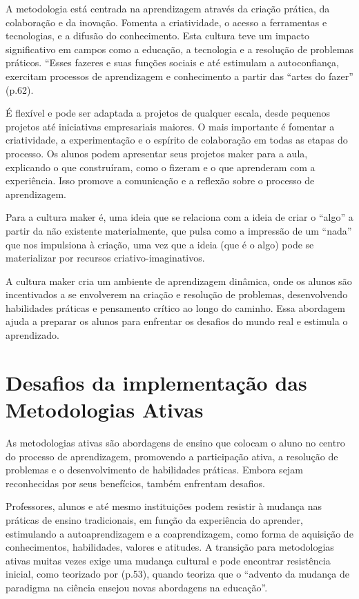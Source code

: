 A metodologia está centrada na aprendizagem através da criação prática, da colaboração e da inovação. Fomenta a criatividade, o acesso a ferramentas e tecnologias, e a difusão do conhecimento. Esta cultura teve um impacto significativo em campos como a educação, a tecnologia e a resolução de problemas práticos. ``Esses fazeres e suas funções sociais e até estimulam a autoconfiança, exercitam processos de aprendizagem e conhecimento a partir das ``artes do fazer'' \cite{CABRAL2021} (p.62).

É flexível e pode ser adaptada a projetos de qualquer escala, desde pequenos projetos até iniciativas empresariais maiores. O mais importante é fomentar a criatividade, a experimentação e o espírito de colaboração em todas as etapas do processo. Os alunos podem apresentar seus projetos maker para a aula, explicando o que construíram, como o fizeram e o que aprenderam com a experiência. Isso promove a comunicação e a reflexão sobre o processo de aprendizagem.

Para  a cultura maker é, uma ideia que se relaciona com a ideia de criar o ``algo'' a partir da não existente materialmente, que pulsa como a impressão de um ``nada'' que nos impulsiona à criação, uma vez que a ideia (que é o algo) pode se materializar por recursos criativo-imaginativos.

A cultura maker cria um ambiente de aprendizagem dinâmica, onde os alunos são incentivados a se envolverem na criação e resolução de problemas, desenvolvendo habilidades práticas e pensamento crítico ao longo do caminho. Essa abordagem ajuda a preparar os alunos para enfrentar os desafios do mundo real e estimula o aprendizado.

\section{Desafios da implementação das Metodologias Ativas}

As metodologias ativas são abordagens de ensino que colocam o aluno no centro do processo de aprendizagem, promovendo a participação ativa, a resolução de problemas e o desenvolvimento de habilidades práticas. Embora sejam reconhecidas por seus benefícios, também enfrentam desafios.

Professores, alunos e até mesmo instituições podem resistir à mudança nas práticas de ensino tradicionais, em função da experiência do aprender, estimulando a autoaprendizagem e a coaprendizagem, como forma de aquisição de conhecimentos, habilidades, valores e atitudes.  A transição para metodologias ativas muitas vezes exige uma mudança cultural e pode encontrar resistência inicial, como teorizado por  (p.53), quando teoriza que o ``advento da mudança de paradigma na ciência ensejou novas abordagens na educação''.

